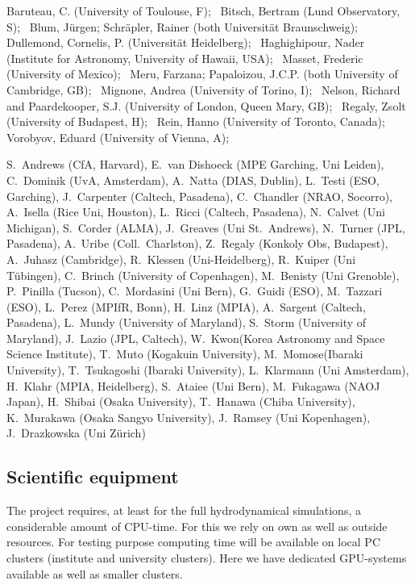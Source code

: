 \documentclass[10pt,fleqn,twoside]{article}
\begin{document}
Baruteau, C. (University of Toulouse, F); \,
Bitsch, Bertram (Lund Observatory, S); \,
Blum, J\"urgen; Schr\"apler, Rainer (both Universit\"at Braunschweig); \,
Dullemond, Cornelis, P. (Universit\"at Heidelberg); \,
Haghighipour, Nader (Institute for Astronomy, University of Hawaii, USA); \,
Masset, Frederic (University of Mexico); \,
Meru, Farzana; Papaloizou, J.C.P. (both University of Cambridge, GB); \,
Mignone, Andrea (University of Torino, I); \,
Nelson, Richard and Paardekooper, S.J. (University of London, Queen Mary, GB); \,
Regaly, Zsolt (University of Budapest, H); \,
Rein, Hanno (University of Toronto, Canada); \,
Vorobyov, Eduard (University of Vienna, A); \,

S.~Andrews (CfA, Harvard),
E.~van Dishoeck (MPE Garching, Uni Leiden),
C.~Dominik (UvA, Amsterdam),
A.~Natta (DIAS, Dublin),
L.~Testi (ESO, Garching),
J.~Carpenter (Caltech, Pasadena),
C.~Chandler (NRAO, Socorro),
A.~Isella (Rice Uni, Houston),
L.~Ricci (Caltech, Pasadena),
N.~Calvet (Uni Michigan),
S.~Corder (ALMA),
J.~Greaves (Uni St.~Andrews),
N.~Turner (JPL, Pasadena),
A.~Uribe (Coll.~Charlston),
Z.~Regaly (Konkoly Obs, Budapest),
A.~Juhasz (Cambridge),
R.~Klessen (Uni-Heidelberg),
R.~Kuiper (Uni T\"ubingen),
C.~Brinch (University of Copenhagen),
M.~Benisty (Uni Grenoble),
P.~Pinilla (Tucson),
C.~Mordasini (Uni Bern),
G.~Guidi (ESO),
M.~Tazzari (ESO),
L.~Perez (MPIfR, Bonn),
H.~Linz (MPIA),
A.~Sargent (Caltech, Pasadena),
L.~Mundy (University of Maryland),
S.~Storm (University of Maryland),
J.~Lazio (JPL, Caltech),
W.~Kwon(Korea Astronomy and Space Science Institute),
T.~Muto (Kogakuin University),
M.~Momose(Ibaraki University),
T.~Tsukagoshi (Ibaraki University),
L.~Klarmann (Uni Amsterdam),
H.~Klahr (MPIA, Heidelberg),
S.~Ataiee (Uni Bern),
M.~Fukagawa (NAOJ Japan),
H.~Shibai (Osaka University),
T.~Hanawa (Chiba University),
K.~Murakawa (Osaka Sangyo University),
J.~Ramsey (Uni Kopenhagen),
J.~Drazkowska (Uni Z\"urich)


\subsection{Scientific equipment}
\label{sec:computers}
The project requires, at least for the full hydrodynamical simulations, a considerable amount of CPU-time.
For this we rely on own as well as outside resources.
For testing purpose computing time will be available on local PC clusters (institute and university clusters).
Here we have dedicated GPU-systems available as well as smaller clusters.
\end{document}
